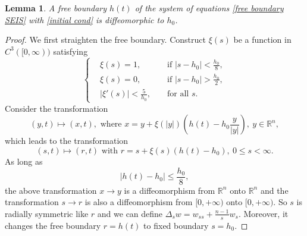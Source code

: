 \documentclass[11pt]{amsart}
\numberwithin{equation}{section}
\theoremstyle{plain}
\newtheorem{lemma}[theorem]{Lemma}
\theoremstyle{definition}
\begin{document}
\begin{lemma} \label{straightening lem}
	A free boundary $h(t)$ of the system of equations \eqref{free boundary SEIS} with \cref{initial cond} is diffeomorphic to $h_0$.
\end{lemma}

\begin{proof}
	We first straighten the free boundary. Construct $\xi(s)$ be a function in $C^3([0, \infty))$ satisfying
		\begin{equation*}
		\left \{ \begin{aligned}
			&\xi(s)=1, &&\text{\ if \ }\lvert s-h_0 \rvert < \frac{h_0}{8},
			\\
			&\xi(s)=0, &&\text{\ if \ }\lvert s-h_0 \rvert > \frac{h_0}{2},
			\\
			&\lvert \xi '(s) \rvert < \frac{5}{h_0}, &&\text{\ for all\ } s.
		\end{aligned} \right.
		\end{equation*}
		Consider the transformation
		\begin{equation*}
			(y,t) \mapsto (x,t), \text{ where } x=y+\xi(\lvert y \rvert )\left(h(t)-h_0 \frac{y}{\lvert y \rvert}\right), \ y \in \mathbb{R}^n,
		\end{equation*}
		which leads to the transformation
		\begin{equation*}
			(s,t) \mapsto (r,t)\text{ with } r=s+\xi(s)(h(t)-h_0),\ 0 \leq s < \infty.
		\end{equation*}
		As long as
		\begin{equation*}
			\lvert h(t)-h_0 \rvert \leq \frac{h_0}{8},
		\end{equation*}
		the above transformation $x \rightarrow y$ is a diffeomorphism from $\mathbb{R}^n$ onto $\mathbb{R}^n$ and the transformation $s \rightarrow r$ is also a diffeomorphism from $[0,+\infty)$ onto $[0,+\infty)$. So $s$ is radially symmetric like $r$ and we can define $\Delta_s w = w_{ss}+ \frac{n-1}{s}w_s$. Moreover, it changes the free boundary $r=h(t)$ to fixed boundary $s=h_0$.
\end{proof}
\end{document}
